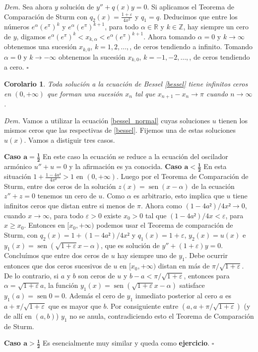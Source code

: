 \documentclass{article}
\newenvironment{demo}{\noindent\emph{Dem.}}{{\hspace*{\fill}$\square$} \newline\vspace{5pt}}
\renewcommand{\epsilon}{\varepsilon}
\DeclareMathOperator{\sen}{sen}
\newtheorem{corolario}[teorema]{Corolario}
\begin{document}
\begin{demo}
Sea ahora $y$ solución de $y''+q(x)y=0$. Si aplicamos el Teorema de Comparación de Sturm con $q_2(x)=\frac{1+\epsilon}{4x^2}$ y $q_1=q$. Deducimos que entre los números  $e^{\alpha}(e^{\pi})^k$ y $e^{\alpha}(e^{\pi})^{k+1}$, para todo $\alpha\in\mathbb{R}$ y $k\in\mathbb{Z}$, hay siempre un cero de $y$, digamos  $e^{\alpha}(e^{\pi})^k<x_{k,\alpha}<e^{\alpha}(e^{\pi})^{k+1}$. Ahora tomando $\alpha=0$ y $k\to\infty$ obtenemos una sucesión $x_{k,0}$, $k=1,2,\ldots,$, de ceros tendiendo a infinito. Tomando $\alpha=0$ y   $k\to-\infty$ obtenemos la sucesión $x_{k,0}$, $k=-1,-2,\ldots,$, de ceros tendiendo a cero.
\end{demo}

\begin{corolario}  Toda solución a la ecuación de Bessel \eqref{bessel} tiene infinitos ceros en $(0,+\infty)$ que forman una sucesión $x_n$ tal que $x_{n+1}-x_n\to\pi$ cuando $n\to\infty$.
\end{corolario}
\begin{demo} Vamos a utilizar la ecuación \eqref{bessel_normal} cuyas soluciones $u$ tienen los mismos ceros que las respectivas de \eqref{bessel}. Fijemos una de estas soluciones $u(x)$. Vamos a distiguir tres casos.

\noindent\textbf{Caso $\boldsymbol{a=\frac12}$} En este caso la ecuación se reduce a la ecuación del oscilador armónico $u''+u=0$ y la afirmación es ya conocida.
\noindent\textbf{Caso $\boldsymbol{a<\frac12}$} En esta situación $1+\frac{1-4a²}{4x²}>1$ en $(0,+\infty)$.  Luego por el Teorema de Comparación de Sturm, entre dos ceros de la solución $z(x)=\sen(x-\alpha)$ de la ecuación $z''+z=0$ tenemos un cero de $u$. Como $\alpha$ es arbitrario, esto implica que $u$ tiene infinitos ceros que distan entre si menos de $\pi$. Ahora como $(1-4a²)/4x²\to 0$, cuando $x\to\infty$, para todo $\epsilon>0$ existe $x_0>0$ tal que   $(1-4a²)/4x<\epsilon$, para $x\geq x_0$. Entonces en $[x_0,+\infty)$  podemos usar el Teorema de comparación de Sturm, con $q_2(x)=1+(1-4a²)/4x²$ y $q_1(x)=1+\epsilon$, $y_2(x)=u(x)$ e $y_1(x)=\sen(\sqrt{1+\epsilon}x-\alpha)$, que es solución de $y''+(1+\epsilon)y=0$. Concluímos que entre dos ceros de $u$ hay siempre uno de $y_1$. Debe ocurrir entonces que  dos ceros sucesivos de $u$ en $[x_0,+\infty)$ distan en más de $\pi/\sqrt{1+\epsilon}$. De lo contrario, si $a$ y $b$ son ceros de $u$ y $b-a< \pi/\sqrt{1+\epsilon}$, entonces para $\alpha=\sqrt{1+\epsilon}a$,   la función $y_1(x)=\sen(\sqrt{1+\epsilon}x-\alpha)$ satisface $y_1(a)=\sen0=0$. Además el cero de $y_1$ inmediato posterior al cero $a$ es  $a+\pi/\sqrt{1+\epsilon}$ que es mayor que $b$. Por consiguiente entre $(a,a+\pi/\sqrt{1+\epsilon})$ (y de allí en $(a,b)$) $y_1$ no se anula, contradiciendo esto el Teorema de Comparación de Sturm.

\noindent\textbf{Caso $\boldsymbol{a>\frac12}$} Es esencialmente muy similar y queda como \textbf{ejercicio}.
\end{demo}
\end{document}

